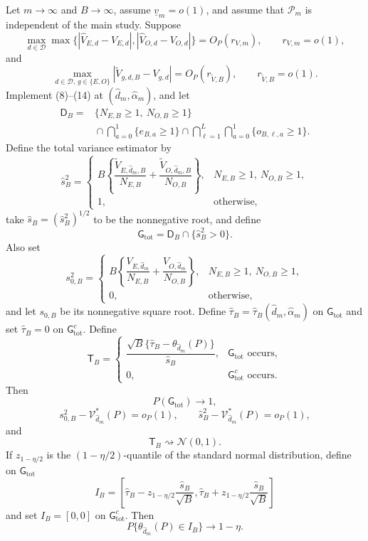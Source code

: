Let \(m\to\infty\) and \(B\to\infty\), assume \(\underline v_m=o(1)\), and assume that \(\mathcal P_m\) is independent of the main study.  Suppose
\[
 \max_{d\in\mathcal D}\max\{|\widehat V_{E,d}-V_{E,d}|,
 |\widehat V_{O,d}-V_{O,d}|\}=O_P(r_{V,m}),
 \qquad r_{V,m}=o(1),                                      \tag{15}
\]
and
\[
 \max_{d\in\mathcal D,\,g\in\{E,O\}}
 |\widetilde V_{g,d,B}-V_{g,d}|=O_P(r_{\widetilde V,B}),
 \qquad r_{\widetilde V,B}=o(1).                           \tag{16}
\]
Implement (8)--(14) at \((\widehat d_m,\widehat\alpha_m)\), and let
\[
\begin{aligned}
 \mathsf D_B
 ={}&\{N_{E,B}\ge1,\ N_{O,B}\ge1\}\\
 &{}\cap\bigcap_{a=0}^1\{e_{B,a}\ge1\}
 \cap\bigcap_{\ell=1}^L\bigcap_{a=0}^1\{o_{B,\ell,a}\ge1\}.
\end{aligned}
\]
Define the total variance estimator by
\[
 \widehat s_B^2
 =\begin{cases}
 B\left\{\dfrac{\widetilde V_{E,\widehat d_m,B}}{N_{E,B}}
 +\dfrac{\widetilde V_{O,\widehat d_m,B}}{N_{O,B}}\right\},
 &N_{E,B}\ge1,\ N_{O,B}\ge1,\\[2mm]
 1,&\text{otherwise},
 \end{cases}                                                \tag{17}
\]
take \(\widehat s_B=(\widehat s_B^2)^{1/2}\) to be the nonnegative root, and define
\[
 \mathsf G_{\mathrm{tot}}
 =\mathsf D_B\cap\{\widehat s_B^2>0\}.                     \tag{18}
\]
Also set
\[
 s_{0,B}^2
 =\begin{cases}
 B\left\{\dfrac{V_{E,\widehat d_m}}{N_{E,B}}
 +\dfrac{V_{O,\widehat d_m}}{N_{O,B}}\right\},
 &N_{E,B}\ge1,\ N_{O,B}\ge1,\\[2mm]
 0,&\text{otherwise},
 \end{cases}                                                \tag{19}
\]
and let \(s_{0,B}\) be its nonnegative square root.  Define \(\widehat\tau_B=\widehat\tau_B(\widehat d_m,\widehat\alpha_m)\) on \(\mathsf G_{\mathrm{tot}}\) and set \(\widehat\tau_B=0\) on \(\mathsf G_{\mathrm{tot}}^c\).  Define
\[
 \mathsf T_B=
 \begin{cases}
 \dfrac{\sqrt B\{\widehat\tau_B-\theta_{\widehat d_m}(P)\}}
 {\widehat s_B},&\mathsf G_{\mathrm{tot}}\text{ occurs},\\[2mm]
 0,&\mathsf G_{\mathrm{tot}}^c\text{ occurs}.
 \end{cases}
\]
Then
\[
 P(\mathsf G_{\mathrm{tot}})\longrightarrow1,               \tag{20}
\]
\[
 s_{0,B}^2-\mathcal V_{\widehat d_m}^*(P)=o_P(1),
 \qquad
 \widehat s_B^2-\mathcal V_{\widehat d_m}^*(P)=o_P(1),      \tag{21}
\]
and
\[
 \mathsf T_B\rightsquigarrow\mathcal N(0,1).                \tag{22}
\]
If \(z_{1-\eta/2}\) is the \((1-\eta/2)\)-quantile of the standard normal distribution, define on \(\mathsf G_{\mathrm{tot}}\)
\[
 I_B=\left[
 \widehat\tau_B-z_{1-\eta/2}\frac{\widehat s_B}{\sqrt B},
 \widehat\tau_B+z_{1-\eta/2}\frac{\widehat s_B}{\sqrt B}
 \right]                                                    \tag{23}
\]
and set \(I_B=[0,0]\) on \(\mathsf G_{\mathrm{tot}}^c\).  Then
\[
 P\{\theta_{\widehat d_m}(P)\in I_B\}\longrightarrow1-\eta.
\]

